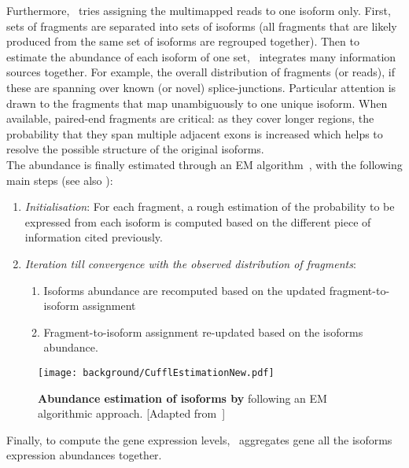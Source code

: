 Furthermore, \cuffl\ tries assigning the multimapped reads to one isoform only.
First, sets of fragments are separated into sets of isoforms
(all fragments that are likely produced from the same set of isoforms
are regrouped together).
Then to estimate the abundance of each isoform of one set,
\cuffl\ integrates many information sources together.
For example, the overall distribution of fragments
(or reads), if these are spanning over known (or novel) splice-junctions.
Particular attention is drawn to the fragments that map unambiguously to one
unique isoform. When available, paired-end fragments are critical:
as they cover longer regions, the probability
that they span multiple adjacent exons is increased which helps to resolve
the possible structure of the original isoforms. \\
The abundance is finally estimated through
an \gls{EM} algorithm~,
with the following main steps (see also ):\mybr\
\begin{enumerate}
    \item \emph{Initialisation}: For each fragment, a rough estimation of the
        probability to be expressed from each isoform is computed based on the
        different piece of information cited previously.
\item \emph{Iteration till convergence with the observed distribution of fragments}:
    \begin{enumerate}
        \item Isoforms abundance are recomputed based on the updated
            fragment-to-isoform assignment \vspace{-2mm}
        \item Fragment-to-isoform assignment re-updated based on the isoforms
            abundance.
    \end{enumerate}
\end{enumerate}


\begin{figure}
    \texttt{[image: background/CufflEstimationNew.pdf]}\centering
    \caption[Abundance estimation of isoforms by
    Cufflinks]{\label{fig:cuffEstimation}\textbf{Abundance estimation of isoforms
    by \cuffl} following an \gls{EM} algorithmic approach. [Adapted
    from~\citet{Turner2015}]}
\end{figure}

Finally, to compute the gene expression levels, \cuffl\ aggregates 
gene all the isoforms expression abundances together.\mybr\

